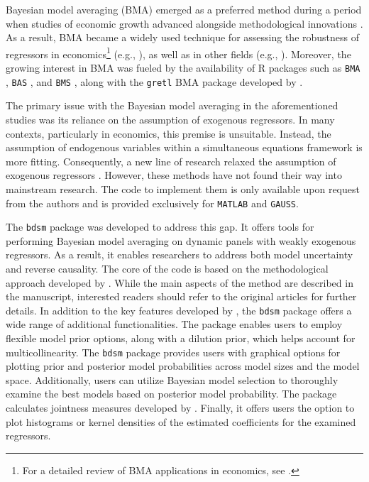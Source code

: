 \documentclass[a4paper]{article}
\begin{document}
Bayesian model averaging (BMA) emerged as a preferred method during a period when studies of economic growth advanced alongside methodological innovations \citep{Fernandez+2001,Fernandez+2001b,Sala+2004,Eicher+2007,Ley+2012,Moser+2014,Fernandez+2001,Fernandez+2001b,Arin+2019}.
As a result, BMA became a widely used technique for assessing the robustness of regressors in economics\footnote{For a detailed review of BMA applications in economics, see \citet{Moral+2015,Steel+2020}.} (e.g., \citet{Liu+2009,Ductor+2016,Figini+2017,Beck+2022,DAndrea+2022,Horvath+2024}), as well as in other fields (e.g., \citet{Sloughter+2013,Baran+2015,Aller+2021,Guliyev+2024,Payne+2024}).
Moreover, the growing interest in BMA was fueled by the availability of R packages such as \verb+BMA+ \citep{Raftery+2005}, \verb+BAS+ \citep{clyde2011bayesian}, and \verb+BMS+ \citep{Feldkircher+2015}, along with the \verb+gretl+ BMA package developed by \citet{Blazejowski+2015}.

The primary issue with the Bayesian model averaging in the aforementioned studies was its reliance on the assumption of exogenous regressors.
In many contexts, particularly in economics, this premise is unsuitable.
Instead, the assumption of endogenous variables within a simultaneous equations framework is more fitting.
Consequently, a new line of research relaxed the assumption of exogenous regressors \citet{Lenkoski+2014,Leon+2015,Mirestean+2016,Moral+2016,Chen+2018}.
However, these methods have not found their way into mainstream research.
The code to implement them is only available upon request from the authors and is provided exclusively for \verb+MATLAB+ and \verb+GAUSS+.

The \verb+bdsm+ package was developed to address this gap.
It offers tools for performing Bayesian model averaging on dynamic panels with weakly exogenous regressors.
As a result, it enables researchers to address both model uncertainty and reverse causality.
The core of the code is based on the methodological approach developed by \citet{Moral+2012,Moral+2013,Moral+2016}.
While the main aspects of the method are described in the manuscript, interested readers should refer to the original articles for further details.
In addition to the key features developed by \citet{Moral+2016}, the \verb+bdsm+ package offers a wide range of additional functionalities.
The package enables users to employ flexible model prior options, along with a dilution prior, which helps account for multicollinearity.
The \verb+bdsm+ package provides users with graphical options for plotting prior and posterior model probabilities across model sizes and the model space.
Additionally, users can utilize Bayesian model selection to thoroughly examine the best models based on posterior model probability.
The package calculates jointness measures developed by \citet{Doppelhofer+2009,Ley+2007,Hofmarcher+2018}.
Finally, it offers users the option to plot histograms or kernel densities of the estimated coefficients for the examined regressors.
\end{document}
